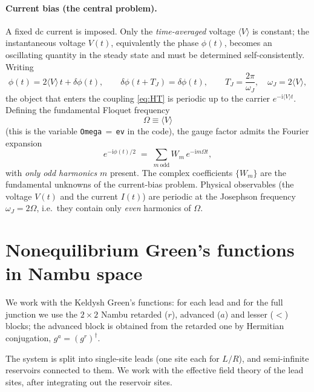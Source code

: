 \documentclass[11pt,a4paper]{article}
\newcommand{\ii}{\mathrm{i}}
\begin{document}
\paragraph{Current bias (the central problem).}
A fixed dc current is imposed.  Only the \emph{time-averaged} voltage
$\langle V\rangle$ is constant; the instantaneous voltage $V(t)$, equivalently
the phase $\phi(t)$, becomes an oscillating quantity in the steady state and must 
be determined self-consistently. Writing
\begin{equation}
  \phi(t) = 2\langle V\rangle\,t + \delta\phi(t),
  \qquad \delta\phi(t+T_J)=\delta\phi(t),
  \qquad T_J = \frac{2\pi}{\omega_J},\quad \omega_J = 2\langle V\rangle,
\end{equation}
the object that enters the coupling \eqref{eq:HT} is periodic up to the carrier
$e^{-\ii\langle V\rangle t}$.  Defining the fundamental Floquet frequency
\begin{equation}
  \boxed{\ \Omega \equiv \langle V\rangle\ }
\end{equation}
(this is the variable \texttt{Omega}\,$=$\,\texttt{ev} in the code), the gauge
factor admits the Fourier expansion
\begin{equation}
  e^{-\ii\phi(t)/2} \;=\; \sum_{m\ \mathrm{odd}} W_m\,e^{-\ii m\Omega t},
  \label{eq:Wexpansion}
\end{equation}
with \emph{only odd harmonics} $m$ present. The complex coefficients $\{W_m\}$ are the
fundamental unknowns of the current-bias problem.  Physical observables (the
voltage $V(t)$ and the current $I(t)$) are periodic at the Josephson frequency
$\omega_J=2\Omega$, i.e.\ they contain only \emph{even} harmonics of $\Omega$.

\section{Nonequilibrium Green's functions in Nambu space}
\label{sec:gf}

We work with the Keldysh Green's functions: for each lead and for the full junction 
we use the $2\times2$ Nambu retarded ($r$), advanced ($a$) and lesser ($<$) blocks; the
advanced block is obtained from the retarded one by Hermitian conjugation, $g^a=(g^r)^\dagger$.

The system is split into single-site leads (one site each for $L/R$), and semi-infinite
reservoirs connected to them. We work with the effective field theory of the lead sites,
after integrating out the reservoir sites.
\end{document}
